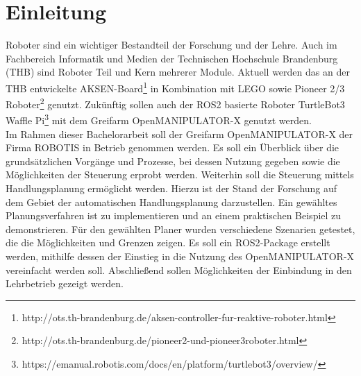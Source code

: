 \section{Einleitung} \label{einleitung}

Roboter sind ein wichtiger Bestandteil der Forschung und der Lehre.
Auch im Fachbereich Informatik und Medien der Technischen Hochschule Brandenburg (THB) sind Roboter Teil und Kern mehrerer Module.
Aktuell werden das an der THB entwickelte AKSEN-Board\footnote{http://ots.th-brandenburg.de/aksen-controller-fur-reaktive-roboter.html} in Kombination mit LEGO sowie Pioneer 2/3 Roboter\footnote{http://ots.th-brandenburg.de/pioneer2-und-pioneer3roboter.html} genutzt.
Zukünftig sollen auch der \acs{ROS2} basierte Roboter TurtleBot3 Waffle Pi\footnote{https://emanual.robotis.com/docs/en/platform/turtlebot3/overview/} mit dem Greifarm OpenMANIPULATOR-X genutzt werden.\\

Im Rahmen dieser Bachelorarbeit soll der Greifarm OpenMANIPULATOR-X der Firma ROBOTIS in Betrieb genommen werden.
Es soll ein Überblick über die grundsätzlichen Vorgänge und Prozesse, bei dessen Nutzung gegeben sowie die Möglichkeiten der Steuerung erprobt werden.
Weiterhin soll die Steuerung mittels Handlungsplanung ermöglicht werden.
Hierzu ist der Stand der Forschung auf dem Gebiet der automatischen Handlungsplanung darzustellen.
Ein gewähltes Planungsverfahren ist zu implementieren und an einem praktischen Beispiel zu demonstrieren.
Für den gewählten Planer wurden verschiedene Szenarien getestet, die die Möglichkeiten und Grenzen zeigen.
Es soll ein \acs{ROS2}-Package erstellt werden, mithilfe dessen der Einstieg in die Nutzung des OpenMANIPULATOR-X vereinfacht werden soll.
Abschließend sollen Möglichkeiten der Einbindung in den Lehrbetrieb gezeigt werden.

